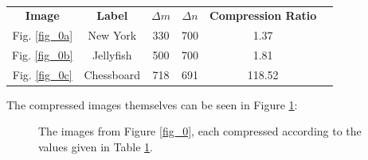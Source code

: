 \documentclass[a4paper,10pt,english]{article}
\begin{document}
\begin{multicols*}{2}
\begin{table}[H]
\center
\begin{tabular}{c c c c c c}
\textbf{Image} & \textbf{Label} & $\Delta m$ & $\Delta n$ & \textbf{Compression Ratio}\\
Fig. \ref{fig_0a} & New York & 330 & 700 & 1.37 \\
Fig. \ref{fig_0b} & Jellyfish & 500 & 700 & 1.81 \\
Fig. \ref{fig_0c} & Chessboard & 718 & 691 & 118.52
\end{tabular}
\caption{\label{table_0}}
\end{table}

The compressed images themselves can be seen in Figure \ref{fig_2}:
\end{multicols*}

\begin{figure}[H]
 \centering
   	\qquad
    \caption{The images from Figure \ref{fig_0}, each compressed according to the values given in Table \ref{table_0}.\label{fig_2}}
\end{figure}
\end{document}
